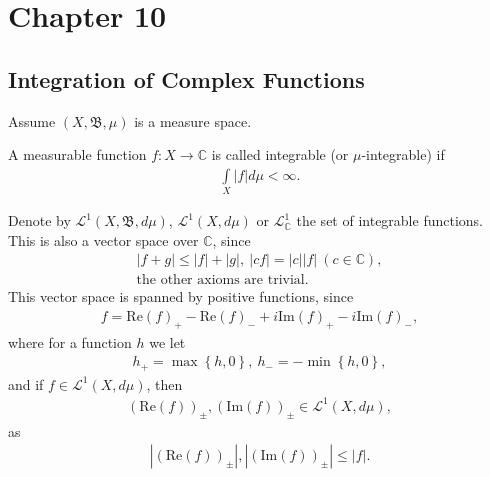 \section{Chapter 10}
\subsection{Integration of Complex Functions}
Assume \((X, \mathfrak{B}, \mu)\) is a measure space.
\begin{definition}
    A measurable function \(f:X\rightarrow \mathbb{C}\) is called integrable (or $\mu$-integrable) if
    \begin{align*}
        \int\limits_{X}|f|d\mu < \infty.
    \end{align*}
\end{definition}
Denote by \(\mathcal{L}^1(X, \mathfrak{B}, d\mu)\), \(\mathcal{L}^1(X, d\mu)\) or \(\mathcal{L}_{\mathbb{C}}^{1}\) the set of integrable
functions. This is also a vector space over $\mathbb{C}$, since
\begin{align*}
    |f + g| \leq |f| + |g|, \ |cf| = |c||f| \ (c\in \mathbb{C}), \\
    \text{the other axioms are trivial}.
\end{align*}
This vector space is spanned by positive functions, since
\begin{align*}
    f = \text{Re}(f)_{+} - \text{Re}(f)_{-} + i\text{Im}(f)_{+} - i\text{Im}(f)_{-},
\end{align*}
where for a function $h$ we let
\begin{align*}
    h_{+} = \max\left\{h,0\right\}, \ h_{-} = -\min\left\{ h,0 \right\},
\end{align*}
and if \(f\in \mathcal{L}^{1}(X, d\mu)\), then
\begin{align*}
    (\text{Re}(f))_{\pm}, (\text{Im}(f))_{\pm} \in \mathcal{L}^{1}(X, d\mu),
\end{align*}
as
\begin{align*}
    |(\text{Re}(f))_{\pm}|, |(\text{Im}(f))_{\pm}| \leq |f|.
\end{align*}

